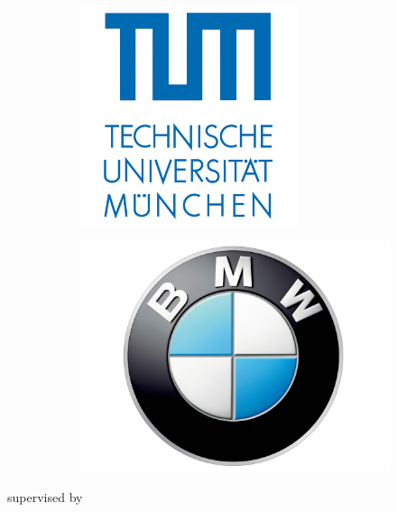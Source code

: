 \begin{titlepage}
\begin{center}
\begin{figure}[h!]
\centering
\begin{subfigure}[t]{0.4\textwidth}
  \centering
  \includegraphics[width=0.7\textwidth]{frontmatter/images/Tum_logo.jpg}
  \end{subfigure}
  \hspace{0.65cm}
\begin{subfigure}[t]{0.4\textwidth}
    \centering
  \includegraphics[width=\textwidth]{frontmatter/images/BMW_Logo.png}
  \end{subfigure}
\end{figure}
\setcounter{figure}{0}

\vspace{2cm}

supervised by 


\end{center}
\end{titlepage}

